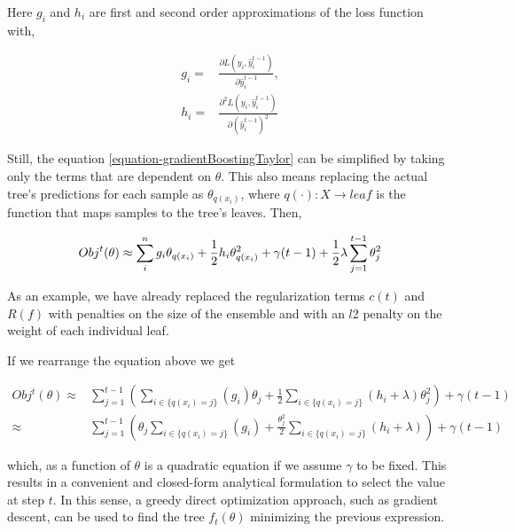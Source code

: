 Here $g_i$ and $h_i$ are first and second order approximations of the loss function with,

\begin{equation}
\begin{split}
g_i = & \frac{\partial L(y_i, \hat{y}^{t-1}_i)}{\partial \hat{y}^{t-1}_i},  \\
h_i = & \frac{\partial^2 L(y_i, \hat{y}^{t-1}_i)}{\partial {(\hat{y}^{t-1}_i)}^2 }
\end{split}
\end{equation}

Still, the equation \cref{equation-gradientBoostingTaylor} can be simplified by taking only the terms that are dependent on $\theta$. This also means replacing the actual tree's predictions for each sample as $\theta_{q(x_i)}$, where $q(\cdot): X \rightarrow leaf$ is the function that maps samples to the tree's leaves. Then,


\begin{equation}\label{eq:gb-objSteps1}
Obj^t(\theta) \approx \sum_i^n {g_i \theta_{q(x_i)} + \frac{1}{2} h_i \theta_{q(x_i)}^2 } + \gamma ({t-1}) + \frac{1}{2}\lambda \sum_{j=1}^{t-1} \theta_j^2 \\
\end{equation}

As an example, we have already replaced the regularization terms $c(t)$ and $R(f)$ with penalties on the size of the ensemble and with an $l$2 penalty on the weight of each individual leaf.

If we rearrange the equation above we get

\begin{equation}\label{eq:gb-objSteps2}
\begin{split}
Obj^t(\theta) \approx & \sum_{j=1}^{t-1} \left( \sum_{i \in \{q(x_i)=j\}} (g_i )\theta_{j} + \frac{1}{2} \sum_{i \in \{q(x_i)=j\}} (h_i + \lambda ) \theta_{j}^2 \right) + \gamma ({t-1}) \\
\approx & \sum_{j=1}^{t-1} \left( \theta_{j}\sum_{i \in \{q(x_i)=j\}} (g_i ) + \frac{\theta_{j}^2}{2} \sum_{i \in \{q(x_i)=j\}} (h_i + \lambda ) \right) + \gamma ({t-1})
\end{split}
\end{equation}

which, as a function of $\theta$ is a quadratic equation if we assume $\gamma$ to be fixed. This results in a convenient and closed-form analytical formulation to select the value at step $t$. In this sense, a greedy direct optimization approach, such as gradient descent, can be used to find the tree $f_t(\theta)$ minimizing the previous expression.

